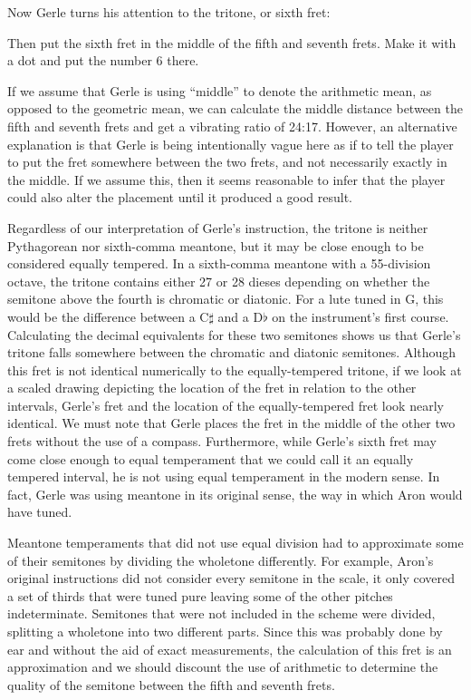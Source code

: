 Now Gerle turns his attention to the tritone, or sixth fret:
\begin{blocks}
Then put the sixth fret in the middle of the fifth and seventh frets. Make it
with a dot and put the number 6 there.
\end{blocks}
If we assume that Gerle is using ``middle'' to denote the arithmetic mean, as opposed
to the geometric mean, we can calculate the middle distance between the
fifth and seventh frets and get a vibrating ratio of 24:17. However, an alternative
explanation is that Gerle is being intentionally vague here as if to tell the player to
put the fret somewhere between the two frets, and not necessarily exactly in the
middle. If we assume this, then it seems reasonable to infer that the player
could also alter the placement until it produced a good result.

Regardless of our interpretation of Gerle's instruction, the tritone is neither Pythagorean nor sixth-comma meantone,
but it may be close enough to be considered equally tempered. In a sixth-comma meantone with a 55-division octave, the
tritone contains either 27 or 28 dieses depending on whether the semitone above the fourth is chromatic or diatonic.
For a lute tuned in G, this would be the difference between a C$\sharp$ and a D$\flat$ on the instrument's first course.
Calculating the decimal equivalents for these two semitones shows us that Gerle's tritone falls somewhere between the
chromatic and diatonic semitones. Although this fret is not identical numerically to the equally-tempered tritone, if
we look at a scaled drawing depicting the location of the fret in relation to the other intervals, Gerle's fret and the
location of the equally-tempered fret look nearly identical. We must note that Gerle places the fret in the middle of
the other two frets without the use of a compass. Furthermore, while Gerle's sixth fret may come close enough to equal
temperament that we could call it an equally tempered interval, he is not using equal temperament in the modern sense.
In fact, Gerle was using meantone in its original sense, the way in which Aron would have tuned.

Meantone temperaments that did not use equal division had to approximate some of their semitones by dividing the
wholetone differently. For example, Aron's original instructions did not consider every semitone in the scale, it only
covered a set of thirds that were tuned pure leaving some of the other pitches indeterminate. Semitones that were not
included in the scheme were divided, splitting a wholetone into two different parts. Since this was probably done by ear
and without the aid of exact measurements, the calculation of this fret is an approximation and we should discount the
use of arithmetic to determine the quality of the semitone between the fifth and seventh frets.

